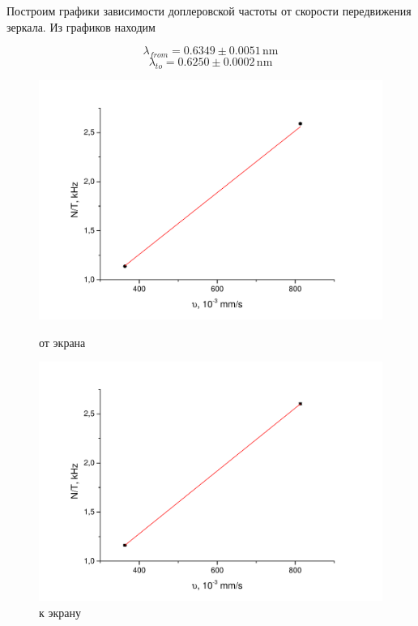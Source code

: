 \documentclass[a4paper,12pt]{article}
\begin{document}
	Построим графики зависимости доплеровской частоты от скорости передвижения зеркала. Из графиков находим
	
	$$
	\lambda_{from} = 0.6349 \pm 0.0051 \, \text{nm} $$$$
	\lambda_{to} = 0.6250 \pm 0.0002 \, \text{nm}
	$$
	
	\begin{figure}[h!]\label{fig:lambda}
		\begin{center}
			\begin{minipage}{0.49\textwidth}
				\includegraphics[width=\textwidth]{fs}
				\caption{от экрана}
			\end{minipage}
			\hfill
			\begin{minipage}{0.49\textwidth}
				\includegraphics[width=\textwidth]{ts}
				\caption{к экрану}
			\end{minipage}
		\end{center}
	\end{figure}
	
\end{document}
